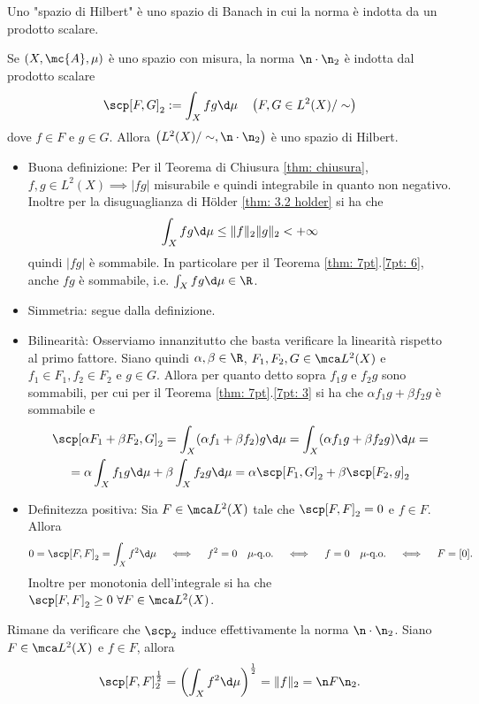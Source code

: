\begin{boxdef}
    Uno "spazio di Hilbert" è uno spazio di Banach in cui la norma è indotta da un prodotto scalare.
\end{boxdef}

\begin{oss}
    Se $(X, \mc{A}, \mu)$ è uno spazio con misura, la norma $\n \cdot\n _{2}$ è indotta dal prodotto scalare
    \[
    \scp[F, G]_{2}:=\int_{X} f g \d \mu \quad\left(F, G \in L^{2}(X) / \sim\right)
    \]
    dove $f \in F$ e $g \in G$. Allora $\left(L^{2}(X) / \sim,\n \cdot\n _{2}\right)$ è uno spazio di Hilbert.
    \begin{itemize}
        \item Buona definizione: Per il Teorema di Chiusura \eqref{thm: chiusura}, $f,g\in L^2(X)\implies |fg|$ misurabile e quindi integrabile in quanto non negativo. Inoltre per la disuguaglianza di Hölder \eqref{thm: 3.2 holder} si ha che 
        \[\int_Xfg\d\mu\leq \|f\|_2\|g\|_2<+\infty\]
        quindi $|fg|$ è sommabile. In particolare per il Teorema \ref{thm: 7pt}.\ref{7pt: 6}, anche $fg$ è sommabile, i.e. $\int_Xfg\d\mu\in\R$.
        \item Simmetria: segue dalla definizione.
        \item Bilinearità: Osserviamo innanzitutto che basta verificare la linearità rispetto al primo fattore. Siano quindi $\alpha, \beta\in \R$, $F_1,F_2,G\in \mca L^2(X)$ e $f_1\in F_1, f_2\in F_2$ e $g\in G$. Allora per quanto detto sopra $f_1g$ e $f_2g$ sono sommabili, per cui per il Teorema \ref{thm: 7pt}.\ref{7pt: 3} si ha che $\alpha f_1g + \beta f_2g$ è sommabile e 
        \begin{multline*}\scp[\alpha F_1+\beta F_2,G]_2 = \int_X(\alpha f_1+\beta f_2)g\d\mu = \int_X(\alpha f_1g+\beta f_2 g)\d\mu =\\= \alpha \int_Xf_1g\d\mu+  \beta \int_Xf_2g\d\mu = \alpha\scp[F_1,G]_2+\beta \scp[F_2,g]_2\end{multline*}
        \item Definitezza positiva: Sia $F\in \mca L^2(X)$ tale che $\scp[F,F]_2 = 0$ e $f\in F$. Allora 
        \[0 = \scp[F,F]_2 = \int_Xf^2\d\mu \quad\iff\quad f^2 = 0\quad\mu\text{-q.o.}\quad\iff\quad f=0\quad \mu\text{-q.o.} \quad\iff\quad F = [0].\]
        Inoltre per monotonia dell'integrale si ha che $\scp[F,F]_2\geq 0\ \forall F\in \mca L^2(X)$.
    \end{itemize}
    Rimane da verificare che $\scp_2$ induce effettivamente la norma $\n \cdot\n_2$. Siano $F\in \mca L^2(X)$ e $f\in F$, allora 
    \[\scp[F,F]_2^{\frac{1}{2}} = \left(\int_Xf^2\d\mu\right)^\frac{1}{2} = \|f\|_2 = \n F\n_2.\]
\end{oss}

